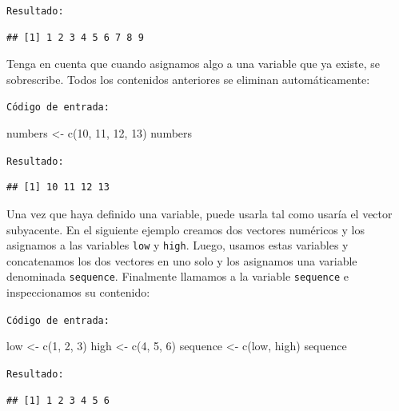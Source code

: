 \documentclass[
]{book}
\newenvironment{Shaded}{\begin{snugshade}}{\end{snugshade}}
\newcommand{\DecValTok}[1]{\textcolor[rgb]{0.00,0.00,0.81}{#1}}
\newcommand{\FunctionTok}[1]{\textcolor[rgb]{0.00,0.00,0.00}{#1}}
\newcommand{\NormalTok}[1]{#1}
\newcommand{\OtherTok}[1]{\textcolor[rgb]{0.56,0.35,0.01}{#1}}
\begin{document}
\texttt{Resultado:}

\begin{verbatim}
## [1] 1 2 3 4 5 6 7 8 9
\end{verbatim}

Tenga en cuenta que cuando asignamos algo a una variable que ya existe, se sobrescribe. Todos los contenidos anteriores se eliminan automáticamente:

\texttt{Código\ de\ entrada:}

\begin{Shaded}
\begin{Highlighting}[]
\NormalTok{numbers }\OtherTok{\textless{}{-}} \FunctionTok{c}\NormalTok{(}\DecValTok{10}\NormalTok{, }\DecValTok{11}\NormalTok{, }\DecValTok{12}\NormalTok{, }\DecValTok{13}\NormalTok{)}
\NormalTok{numbers}
\end{Highlighting}
\end{Shaded}

\texttt{Resultado:}

\begin{verbatim}
## [1] 10 11 12 13
\end{verbatim}

Una vez que haya definido una variable, puede usarla tal como usaría el vector subyacente. En el siguiente ejemplo creamos dos vectores numéricos y los asignamos a las variables \texttt{low} y \texttt{high}. Luego, usamos estas variables y concatenamos los dos vectores en uno solo y los asignamos una variable denominada \texttt{sequence}. Finalmente llamamos a la variable \texttt{sequence} e inspeccionamos su contenido:

\texttt{Código\ de\ entrada:}

\begin{Shaded}
\begin{Highlighting}[]
\NormalTok{low }\OtherTok{\textless{}{-}} \FunctionTok{c}\NormalTok{(}\DecValTok{1}\NormalTok{, }\DecValTok{2}\NormalTok{, }\DecValTok{3}\NormalTok{)}
\NormalTok{high }\OtherTok{\textless{}{-}} \FunctionTok{c}\NormalTok{(}\DecValTok{4}\NormalTok{, }\DecValTok{5}\NormalTok{, }\DecValTok{6}\NormalTok{)}
\NormalTok{sequence }\OtherTok{\textless{}{-}} \FunctionTok{c}\NormalTok{(low, high)}
\NormalTok{sequence}
\end{Highlighting}
\end{Shaded}

\texttt{Resultado:}

\begin{verbatim}
## [1] 1 2 3 4 5 6
\end{verbatim}
\end{document}
